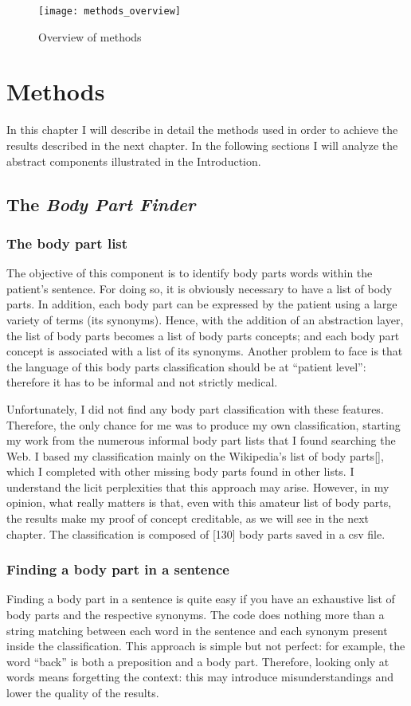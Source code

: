\begin{figure}[h]
\centering
\texttt{[image: methods\_overview]}
\caption{Overview of methods}
\medskip
\end{figure}

\chapter{Methods}
\label{cha:methods}
In this chapter I will describe in detail the methods used in order to achieve the results described in the next chapter. In the following sections I will analyze the abstract components illustrated in the Introduction.

\section{The \textit{Body Part Finder}}
\label{sec:body_part_finder}
\subsection{The body part list}
The objective of this component is to identify body parts words within the patient's sentence. For doing so, it is obviously necessary to have a list of body parts. In addition, each body part can be expressed by the patient using a large variety of terms (its synonyms). Hence, with the addition of an abstraction layer, the list of body parts becomes a list of body parts concepts; and each body part concept is associated with a list of its synonyms. Another problem to face is that the language of this body parts classification should be at “patient level”: therefore it has to be informal and not strictly medical.

Unfortunately, I did not find any body part classification with these features. Therefore, the only chance for me was to produce my own classification, starting my work from the numerous informal body part lists that I found searching the Web. I based my classification mainly on the Wikipedia's list of body parts[], which I completed with other missing body parts found in other lists. I understand the licit perplexities that this approach may arise. However, in my opinion, what really matters is that, even with this amateur list of body parts, the results make my proof of concept creditable, as we will see in the next chapter. The classification is composed of [130] body parts saved in a csv file.

\subsection{Finding a body part in a sentence}
Finding a body part in a sentence is quite easy if you have an exhaustive list of body parts and the respective synonyms. The code does nothing more than a string matching between each word in the sentence and each synonym present inside the classification. This approach is simple but not perfect: for example, the word “back” is both a preposition and a body part. Therefore, looking only at words means forgetting the context: this may introduce misunderstandings and lower the quality of the results.

